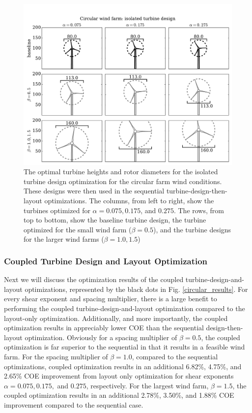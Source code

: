 \begin{figure}[htbp]
  \centering
  \includegraphics[width=\textwidth]{Figures/turbineSizesCircular_sequential.pdf}
  \caption{\label{circular_turbines_seq} The optimal turbine heights and rotor diameters for the isolated turbine design optimization for the circular farm wind conditions. These designs were then used in the sequential turbine-design-then-layout optimizations. The columns, from left to right, show the turbines optimized for $\alpha=0.075,0.175$, and $0.275$. The rows, from top to bottom, show the baseline turbine design, the turbine optimized for the small wind farm ($\beta=0.5$), and the turbine designs for the larger wind farms ($\beta=1.0,1.5$)}
\end{figure}


\subsubsection{Coupled Turbine Design and Layout Optimization}
Next we will discuss the optimization results of the coupled turbine-design-and-layout optimizations, represented by the black dots in Fig. \ref{circular_results}. For every shear exponent and spacing multiplier, there is a large benefit to performing the coupled turbine-design-and-layout optimization compared to the layout-only optimization. Additionally, and more importantly, the coupled optimization results in appreciably lower COE than the sequential design-then-layout optimization. Obviously for a spacing multiplier of $\beta=0.5$, the coupled optimization is far superior to the sequential in that it results in a feasible wind farm. For the spacing multiplier of $\beta=1.0$, 
compared to the sequential optimizations, coupled optimization results in an additional 6.82\%, 4.75\%, and 2.65\% COE improvement from layout only optimization for shear exponents $\alpha=0.075, 0.175,$ and $0.275$, respectively. For the largest wind farm, $\beta=1.5$, the coupled optimization results in an additional 2.78\%, 3.50\%, and 1.88\% COE improvement compared to the sequential case. 


